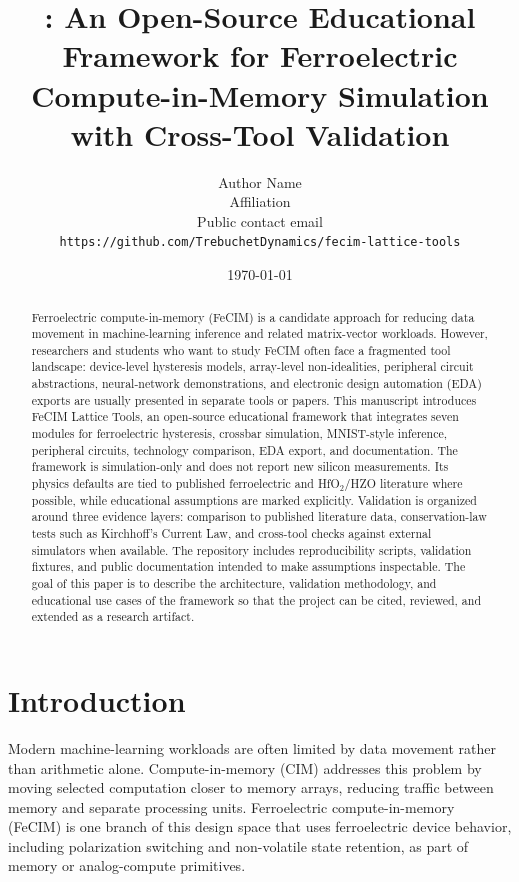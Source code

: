 \documentclass[11pt]{article}
\title{\project: An Open-Source Educational Framework for Ferroelectric Compute-in-Memory Simulation with Cross-Tool Validation}
\author{
  Author Name\\
  Affiliation\\
  Public contact email\\
  \texttt{https://github.com/TrebuchetDynamics/fecim-lattice-tools}
}
\date{\today}
\newcommand{\project}{FeCIM Lattice Tools}
\begin{document}
\maketitle

\begin{abstract}
Ferroelectric compute-in-memory (FeCIM) is a candidate approach for reducing data movement in machine-learning inference and related matrix-vector workloads. However, researchers and students who want to study FeCIM often face a fragmented tool landscape: device-level hysteresis models, array-level non-idealities, peripheral circuit abstractions, neural-network demonstrations, and electronic design automation (EDA) exports are usually presented in separate tools or papers. This manuscript introduces \project, an open-source educational framework that integrates seven modules for ferroelectric hysteresis, crossbar simulation, MNIST-style inference, peripheral circuits, technology comparison, EDA export, and documentation. The framework is simulation-only and does not report new silicon measurements. Its physics defaults are tied to published ferroelectric and HfO$_2$/HZO literature where possible, while educational assumptions are marked explicitly. Validation is organized around three evidence layers: comparison to published literature data, conservation-law tests such as Kirchhoff's Current Law, and cross-tool checks against external simulators when available. The repository includes reproducibility scripts, validation fixtures, and public documentation intended to make assumptions inspectable. The goal of this paper is to describe the architecture, validation methodology, and educational use cases of the framework so that the project can be cited, reviewed, and extended as a research artifact.
\end{abstract}

\section{Introduction}

Modern machine-learning workloads are often limited by data movement rather than arithmetic alone. Compute-in-memory (CIM) addresses this problem by moving selected computation closer to memory arrays, reducing traffic between memory and separate processing units. Ferroelectric compute-in-memory (FeCIM) is one branch of this design space that uses ferroelectric device behavior, including polarization switching and non-volatile state retention, as part of memory or analog-compute primitives.
\end{document}
